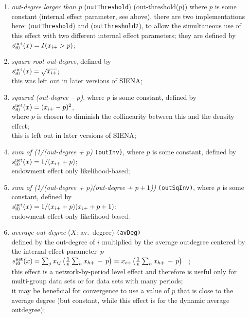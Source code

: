 \documentclass[a4paper,fleqn,11pt]{article}
\newcommand{\+}{\, + \,}
\newcommand{\si}{{\sf SIENA}}
\newcommand{\vit}{\theenumi}
\begin{document}
\begin{enumerate}
 \item {\em out-degree larger than $p$} (\texttt{outThreshold}) 
 (out-threshold($p$)) where $p$ is some constant
 (internal effect parameter, see above),
  there are two implementations here:
(\texttt{outThreshold}) and (\texttt{outThreshold2}),
 to allow the simultaneous use of this
 effect with two different internal effect parameters;
 they are defined by \\
 $s^{\rm net}_{i\vit}(x) = I(x_{i+} > p)$;\\

 \item {\em square root out-degree}, defined by  \\
 $s^{\rm net}_{i\vit}(x) = \sqrt{x_{i+}}$;\\
 this was left out in later versions of \si;

 \item {\em squared (out-degree -- $p$)}, where $p$ is some constant,
 defined by  \\
 $s^{\rm net}_{i\vit}(x) = (x_{i+} - p)^2$,\\
 where $p$ is chosen to diminish the collinearity between this
 and the density effect;\\
 this is left out in later versions of \si;

 \item {\em sum of (1/(out-degree + $p$)} \texttt{(outInv)},
 where $p$ is some constant,  defined by  \\
 $s^{\rm net}_{i\vit}(x) = 1/(x_{i+} + p)$;\\
 endowment effect only likelihood-based;

 \item {\em sum of (1/(out-degree + $p$)(out-degree + $p+1$))} \texttt{(outSqInv)},
 where $p$ is some constant, defined by  \\
 $s^{\rm net}_{i\vit}(x) = 1/(x_{i+} + p)(x_{i+} + p + 1)$;\\
 endowment effect only likelihood-based.

 \item {\em average out-degree} ($X$: av.\ degree) \texttt{(avDeg)}\\
 defined by the out-degree of $i$ multiplied by the
 average outdegree centered by the internal effect parameter~$p$\\[0.2em]
 $s^{\rm net}_{i\vit}(x) =  \sum_j x_{ij}\, \big( \frac 1n \sum_h  {x_{h+}} \,-\, p \big)=
                           x_{i+}\, \big( \frac 1n \sum_h x_{h+} \,-\, p \big) $ \, ;\\[0.2em]
  this effect is a network-by-period level effect and therefore is useful only
  for \\
  multi-group data sets or for data sets with many periods;\\
  it may be beneficial for convergence to use a value of $p$ that is
  close to the average degree (but constant, while this effect
  is for the dynamic average outdegree);


\end{enumerate}
\end{document}
